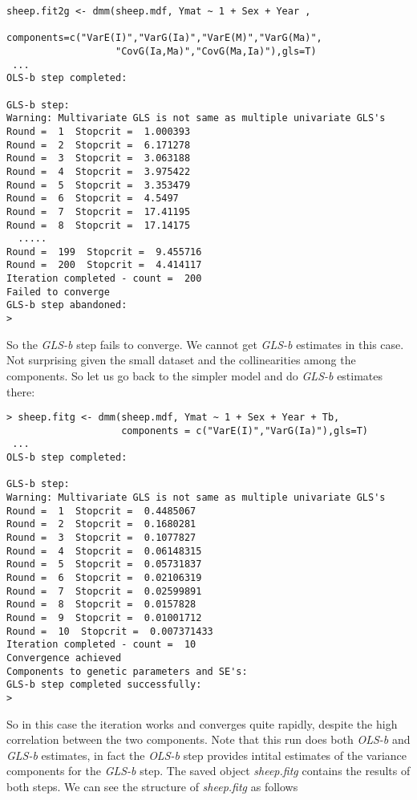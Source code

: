 \documentclass[titlepage]{article}  %
\begin{document}
\begin{verbatim}
sheep.fit2g <- dmm(sheep.mdf, Ymat ~ 1 + Sex + Year ,
                   components=c("VarE(I)","VarG(Ia)","VarE(M)","VarG(Ma)",
                   "CovG(Ia,Ma)","CovG(Ma,Ia)"),gls=T)
 ...
OLS-b step completed:

GLS-b step:
Warning: Multivariate GLS is not same as multiple univariate GLS's
Round =  1  Stopcrit =  1.000393 
Round =  2  Stopcrit =  6.171278 
Round =  3  Stopcrit =  3.063188 
Round =  4  Stopcrit =  3.975422 
Round =  5  Stopcrit =  3.353479 
Round =  6  Stopcrit =  4.5497 
Round =  7  Stopcrit =  17.41195 
Round =  8  Stopcrit =  17.14175 
  .....
Round =  199  Stopcrit =  9.455716 
Round =  200  Stopcrit =  4.414117 
Iteration completed - count =  200 
Failed to converge
GLS-b step abandoned:
>
\end{verbatim}

 So the {\em GLS-b} step fails to converge. We cannot get {\em GLS-b} estimates in this case.  Not surprising given the small dataset and the collinearities among the components. So let us go back to the simpler model and do {\em GLS-b} estimates there:

\begin{verbatim}
> sheep.fitg <- dmm(sheep.mdf, Ymat ~ 1 + Sex + Year + Tb,
                    components = c("VarE(I)","VarG(Ia)"),gls=T)
 ...
OLS-b step completed:

GLS-b step:
Warning: Multivariate GLS is not same as multiple univariate GLS's
Round =  1  Stopcrit =  0.4485067 
Round =  2  Stopcrit =  0.1680281 
Round =  3  Stopcrit =  0.1077827 
Round =  4  Stopcrit =  0.06148315 
Round =  5  Stopcrit =  0.05731837 
Round =  6  Stopcrit =  0.02106319 
Round =  7  Stopcrit =  0.02599891 
Round =  8  Stopcrit =  0.0157828 
Round =  9  Stopcrit =  0.01001712 
Round =  10  Stopcrit =  0.007371433 
Iteration completed - count =  10 
Convergence achieved
Components to genetic parameters and SE's:
GLS-b step completed successfully:
> 
\end{verbatim}

 So in this case the iteration works and converges quite rapidly, despite the high correlation between the two components. Note that this run does both {\em OLS-b} and {\em GLS-b} estimates, in fact the {\em OLS-b} step provides intital estimates of the variance components for the {\em GLS-b} step. The saved object {\em sheep.fitg} contains the results of both steps. We can see the structure of {\em sheep.fitg} as follows
\end{document}
